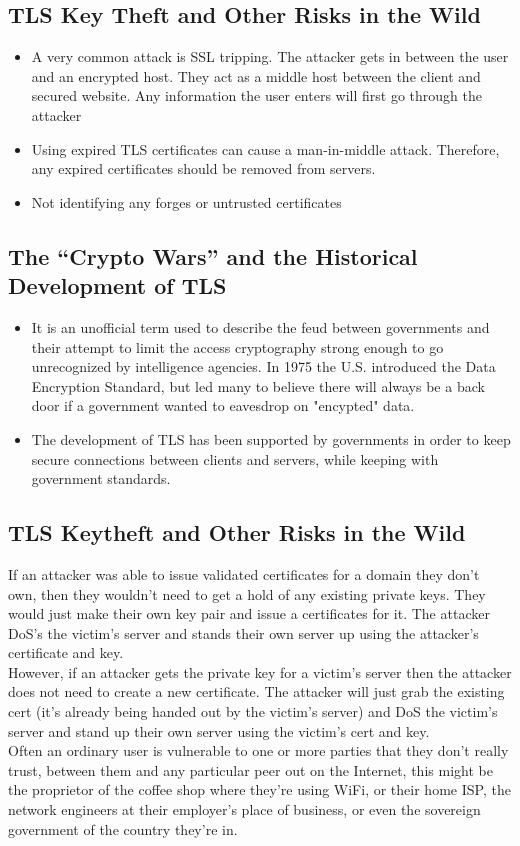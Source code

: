 \documentclass[11pt]{article} %
\begin{document}
\subsection{TLS Key Theft and Other Risks in the Wild}
\begin{itemize}
  \item A very common attack is SSL tripping. The attacker gets in between the user and an encrypted host. They act as a middle host between the client and secured website. Any information the user enters will first go through the attacker
  \item Using expired TLS certificates can cause a man-in-middle attack. Therefore, any expired certificates should be removed from servers.
 \item Not identifying any forges or untrusted certificates
\end{itemize}

\subsection{The “Crypto Wars” and the Historical Development of TLS}
\begin{itemize}
  \item It is an unofficial term used to describe the feud between governments and their attempt to limit the access cryptography strong enough to go unrecognized by intelligence agencies. In 1975 the U.S. introduced the Data Encryption Standard, but led many to believe there will always be a back door if a government wanted to eavesdrop on "encypted" data.
  \item The development of TLS has been supported by governments in order to keep secure connections between clients and servers, while keeping with government standards.
\end{itemize}

\subsection{TLS Keytheft and Other Risks in the Wild}
If an attacker was able to issue validated certificates for a domain they don’t own, then they wouldn’t need to get a hold of any existing private keys. They would just make their own key pair and issue a certificates for it. The attacker DoS’s the victim’s server and stands their own server up using the attacker’s certificate and key.
\\
However, if an attacker gets the private key for a victim’s server then the attacker does not need to create a new certificate. The attacker will just grab the existing cert (it’s already being handed out by the victim’s server) and DoS the victim’s server and stand up their own server using the victim’s cert and key.
\\
Often an ordinary user is vulnerable to one or more parties that they don't really trust, between them and any particular peer out on the Internet, this might be the proprietor of the coffee shop where they're using WiFi, or their home ISP, the network engineers at their employer's place of business, or even the sovereign government of the country they're in.
\end{document}
